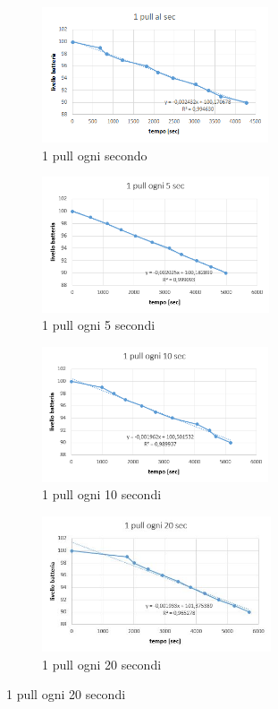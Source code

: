 \documentclass{article}
\begin{document}
\begin{figure}[h]
\begin{subfigure}{0.5\textwidth}
\includegraphics[width=0.9\linewidth,height=4cm]{1alsec.jpg} %
\caption{1 pull ogni secondo}
\end{subfigure}
\begin{subfigure}{0.5\textwidth}
\includegraphics[width=0.9\linewidth,height=4cm]{5alsec.jpg} %
\caption{1 pull ogni 5 secondi}
\end{subfigure}
\begin{subfigure}{0.5\textwidth}
\includegraphics[width=0.9\linewidth,height=4cm]{10alsec.jpg} %
\caption{1 pull ogni 10 secondi}
\end{subfigure}
\begin{subfigure}{0.5\textwidth}
\includegraphics[width=0.9\linewidth,height=4cm]{20alsec.jpg} %
\caption{1 pull ogni 20 secondi}
\end{subfigure}
\end{figure}
\end{document}
